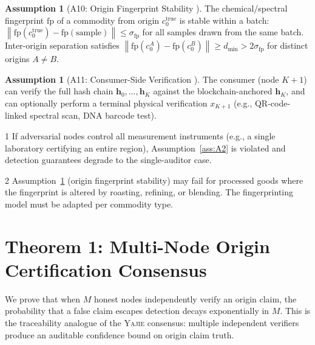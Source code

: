 \documentclass[11pt,a4paper]{article}
\theoremstyle{definition}
\newtheorem{assumption}[theorem]{Assumption}
\theoremstyle{remark}
\newcommand{\Yajie}{\textsc{Yajie}}
\newcommand{\norm}[1]{\left\lVert#1\right\rVert}
\newcommand{\hashChain}{\mathbf{h}}
\begin{document}
\begin{assumption}[A10: Origin Fingerprint Stability ]
\label{ass:A10}
The chemical/spectral fingerprint $\text{fp}$ of a commodity from origin $c_0^{\text{true}}$ is stable within a batch: $\norm{\text{fp}(c_0^{\text{true}}) - \text{fp}(\text{sample})} \leq \sigma_{\text{fp}}$ for all samples drawn from the same batch. Inter-origin separation satisfies $\norm{\text{fp}(c_0^A) - \text{fp}(c_0^B)} \geq d_{\min} > 2\sigma_{\text{fp}}$ for distinct origins $A \neq B$.
\end{assumption}

\begin{assumption}[A11: Consumer-Side Verification ]
\label{ass:A11}
The consumer (node $K+1$) can verify the full hash chain $\hashChain_0, \ldots, \hashChain_K$ against the blockchain-anchored $\hashChain_K$, and can optionally perform a terminal physical verification $x_{K+1}$ (e.g., QR-code-linked spectral scan, DNA barcode test).
\end{assumption}

\begin{limitationTag}{1}
If adversarial nodes control all measurement instruments (e.g., a single laboratory certifying an entire region), Assumption~\ref{ass:A2} is violated and detection guarantees degrade to the single-auditor case.
\end{limitationTag}

\begin{limitationTag}{2}
Assumption~\ref{ass:A10} (origin fingerprint stability) may fail for processed goods where the fingerprint is altered by roasting, refining, or blending. The fingerprinting model must be adapted per commodity type.
\end{limitationTag}

\section{Theorem 1: Multi-Node Origin Certification Consensus }
\label{sec:theorem1}

We prove that when $M$ honest nodes independently verify an origin claim, the probability that a false claim escapes detection decays exponentially in $M$. This is the traceability analogue of the \Yajie{} consensus: multiple independent verifiers produce an auditable confidence bound on origin claim truth.
\end{document}
